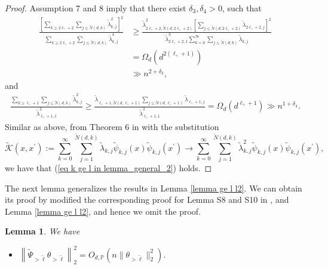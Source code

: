 \documentclass{article}
\theoremstyle{plain}
\newtheorem{lemma}[theorem]{Lemma}
\theoremstyle{definition}
\theoremstyle{remark}
\begin{document}
\begin{appendix}
\begin{proof}
Assumption 7 and 8 imply that there exist $\delta_3, \delta_4>0$, such that
\begin{align*}
    \frac{\left[\sum_{k \geq 2\ell_{\gamma}+2} \sum_{j \leq \tilde{N}(d, k)} \tilde{\lambda}_{k, j}^2 \right]^2}{\sum_{k \geq 2\ell_{\gamma}+2} \sum_{j \leq \tilde{N}(d, k)} \tilde{\lambda}_{k, j}^4 } 
    & \geq 
    \frac{\tilde{\lambda}_{2\ell_{\gamma}+2, \tilde{N}(d, 2\ell_{\gamma}+2)}^2\left[\sum_{j \leq \tilde{N}(d, 2\ell_{\gamma}+2)} \tilde{\lambda}_{2\ell_{\gamma}+2, j} \right]^2}{\tilde{\lambda}_{2\ell_{\gamma}+2, 1}^3\sum_{k = 0}^{\infty} \sum_{j \leq \tilde{N}(d, k)} \tilde{\lambda}_{k, j}}
   \\
   & = 
    \Omega_d(d^{2(\ell_{\gamma}+1)})\\
   & \gg n^{2+\delta_3},
\end{align*}
and
\begin{align*}
    \frac{\sum_{k \geq \ell_{\gamma}+1} \sum_{j \leq \tilde{N}(d, k)} \tilde{\lambda}_{k, j}^2 }{\tilde{\lambda}_{\ell_{\gamma}+1, 1}^2} \geq \frac{\tilde{\lambda}_{\ell_{\gamma}+1, \tilde{N}(d, \ell_{\gamma}+1)} \sum_{j \leq \tilde{N}(d, \ell_{\gamma}+1)} \tilde{\lambda}_{\ell_{\gamma}+1, j} }{\tilde{\lambda}_{\ell_{\gamma}+1, 1}^2}
    = \Omega_d(d^{\ell_{\gamma}+1}) \gg n^{1+\delta_4}.
\end{align*}
Similar as above, from Theorem 6 in \cite{mei2022generalization} with the substitution 
$$
\tilde{\mathscr{K}}(x,x^\prime) := \sum_{k=0}^{\infty} \sum_{j=1}^{\tilde{N}(d, k)} \tilde{\lambda}_{k, j}  \tilde{\psi}_{k, j}(x) \tilde{\psi}_{k, j}\left(x^\prime\right) \to \sum_{k=0}^{\infty} \sum_{j=1}^{\tilde{N}(d, k)} \tilde{\lambda}_{k, j}^2  \tilde{\psi}_{k, j}(x) \tilde{\psi}_{k, j}\left(x^\prime\right),
$$
we have that (\ref{eq k ge l in lemma_general_2}) holds.
\end{proof}

The next lemma generalizes the results in Lemma \ref{lemma ge l l2}. We can obtain its proof by modified the corresponding proof for Lemma S8 and S10 in \cite{zhang2024phase}, and Lemma \ref{lemma ge l l2}, and hence we omit the proof.

\begin{lemma}\label{lemma ge l l2_general}
We have
\begin{itemize}
    \item[(i)] $\left\| \tilde{\Psi}_{>\tilde{\ell}} \theta_{>\tilde{\ell}} \right\|_{2}^{2} = O_{d, \mathbb{P}}\left( n  \| \theta_{>\tilde{\ell}} \|_{2}^{2}\right)$.


\end{itemize}
\end{lemma}
\end{appendix}
\end{document}

